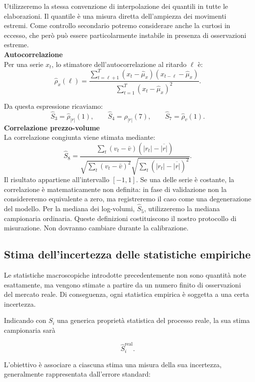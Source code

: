 Utilizzeremo la stessa convenzione di interpolazione dei quantili in tutte le elaborazioni.
Il quantile è una misura diretta dell'ampiezza dei movimenti estremi. Come controllo secondario potremo considerare anche la curtosi in eccesso, 
che però può essere particolarmente instabile in presenza di osservazioni estreme.\\
\textbf{Autocorrelazione}\\
Per una serie \(x_t\), lo stimatore dell'autocorrelazione al ritardo \(\ell\) è:
\[
\widehat\rho_x(\ell)=
\frac{
\displaystyle\sum_{t=\ell+1}^{T}
(x_t-\widehat\mu_x)
(x_{t-\ell}-\widehat\mu_x)
}{
\displaystyle\sum_{t=1}^{T}(x_t-\widehat\mu_x)^2
}.
\]

Da questa espressione ricaviamo:
\[
\widehat S_3=\widehat\rho_{|r|}(1),
\qquad
\widehat S_4=\widehat\rho_{|r|}(7),
\qquad
\widehat S_7=\widehat\rho_v(1).
\]
\textbf{Correlazione prezzo-volume}\\
La correlazione congiunta viene stimata mediante:
\[
\widehat S_8=
\frac{
\sum_t(v_t-\bar v)(|r_t|-\overline{|r|})
}{
\sqrt{\sum_t(v_t-\bar v)^2}
\sqrt{\sum_t(|r_t|-\overline{|r|})^2}
}.
\]
Il risultato appartiene all'intervallo \([-1,1]\). Se una delle serie è costante, la correlazione è matematicamente non definita: in fase di validazione non la considereremo equivalente a zero, ma registreremo il caso come una degenerazione del modello.
Per la mediana dei log-volumi, \(\widehat S_5\), utilizzeremo la mediana campionaria ordinaria.
Queste definizioni costituiscono il nostro protocollo di misurazione. Non dovranno cambiare durante la calibrazione.

\subsection{Stima dell'incertezza delle statistiche empiriche}

Le statistiche macroscopiche introdotte precedentemente non sono quantità note
esattamente, ma vengono stimate a partire da un numero finito di osservazioni
del mercato reale. Di conseguenza, ogni statistica empirica è soggetta a una
certa incertezza.

Indicando con $S_i$ una generica proprietà statistica del processo reale,
la sua stima campionaria sarà

\[
\widehat{S}_i^{\mathrm{real}}.
\]

L'obiettivo è associare a ciascuna stima una misura della sua incertezza,
generalmente rappresentata dall'errore standard:

